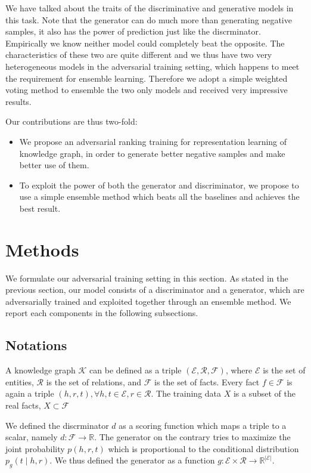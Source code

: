 \documentclass[twocolumn,a4paper,10pt,review,5p]{elsarticle}
\begin{document}
We have talked about the traits of the discriminative and generative models in this task. Note that the generator can do much more than generating negative samples, it also has the power of prediction just like the discrminator. Empirically we know neither model could completely beat the opposite. The characteristics of these two are quite different and we thus have two very heterogeneous models in the adversarial training setting, which happens to meet the requirement for ensemble learning. Therefore we adopt a simple weighted voting method to ensemble the two only models and received very impressive results.

Our contributions are thus two-fold:
\begin{itemize}
    \item We propose an adversarial ranking training for representation learning of knowledge graph, in order to generate better negative samples and make better use of them.
    \item To exploit the power of both the generator and discriminator, we propose to use a simple ensemble method which beats all the baselines and achieves the best result.
\end{itemize}



\section{Methods}

We formulate our adversarial training setting in this section. As stated in the previous section, our model consists of a discriminator and a generator, which are adversarially trained and exploited together through an ensemble method. We report each components in the following subsections.

\subsection{Notations}

A knowledge graph $\mathcal{K}$ can be defined as a triple $(\mathcal{E}, \mathcal{R}, \mathcal{F})$, where $\mathcal{E}$ is the set of entities, $\mathcal{R}$ is the set of relations, and $\mathcal{F}$ is the set of facts. Every fact $f\in \mathcal{F}$ is again a triple $(h, r, t), \forall h,t\in\mathcal{E}, r\in\mathcal{R}$. The training data $X$ is a subset of the real facts, $X \subset \mathcal{F}$

We defined the discrminator $d$ as a scoring function which maps a triple to a scalar, namely $d: \mathcal{F}\rightarrow \mathbb{R}$. The generator on the contrary tries to maximize the joint probability $p(h, r, t)$ which is proportional to the conditional distribution $p_g(t \mid h, r)$. We thus defined the generator as a function $g: \mathcal{E} \times \mathcal{R} \rightarrow \mathbb{R}^{\lvert \mathcal{E} \rvert}$.
\end{document}
